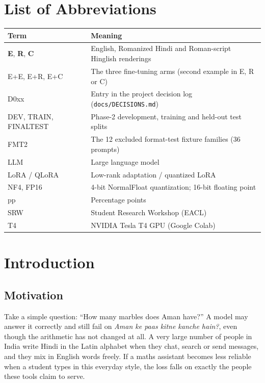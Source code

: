 \documentclass[12pt,a4paper,oneside]{report}
\renewcommand{\_}{\oldunderscore\allowbreak}
\newcommand{\form}[1]{\textbf{#1}}
\begin{document}
\chapter*{List of Abbreviations}
\thispagestyle{plain}

{
\begin{tabular}{@{}p{3.2cm}p{10.5cm}@{}}
\toprule
\textbf{Term} & \textbf{Meaning}\\
\midrule
\form{E}, \form{R}, \form{C} & English, Romanized Hindi and Roman-script Hinglish renderings\\
E+E, E+R, E+C & The three fine-tuning arms (second example in E, R or C)\\
D0xx & Entry in the project decision log (\texttt{docs/DECISIONS.md})\\
DEV, TRAIN, FINAL\_TEST & Phase-2 development, training and held-out test splits\\
FMT2 & The 12 excluded format-test fixture families (36 prompts)\\
LLM & Large language model\\
LoRA / QLoRA & Low-rank adaptation / quantized LoRA\\
NF4, FP16 & 4-bit NormalFloat quantization; 16-bit floating point\\
pp & Percentage points\\
SRW & Student Research Workshop (EACL)\\
T4 & NVIDIA Tesla T4 GPU (Google Colab)\\
\bottomrule
\end{tabular}\par}

\cleardoublepage
{}

\chapter{Introduction}
\label{ch:intro}

\section{Motivation}

Take a simple question: ``How many marbles does Aman have?'' A model may answer it correctly and still fail on \emph{Aman ke paas kitne kanche hain?}, even though the arithmetic has not changed at all. A very large number of people in India write Hindi in the Latin alphabet when they chat, search or send messages, and they mix in English words freely. If a maths assistant becomes less reliable when a student types in this everyday style, the loss falls on exactly the people these tools claim to serve.
\end{document}
